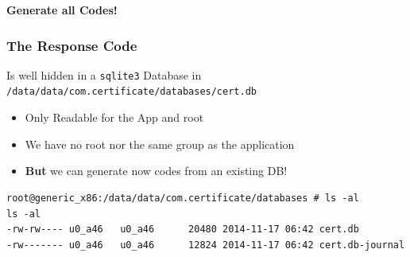 \documentclass[12pt,a4paper]{beamer}
\newcommand{\mybox}[1]{\par\noindent\colorbox{shadecolor}
{\color{textcolor}\parbox{\dimexpr\textwidth-2\fboxsep\relax}{\fontsize{3em}{3.5em}\selectfont\textbf{{#1}}}}}
\begin{document}
{
\begin{frame}[plain]

\mybox{Generate all Codes!}

\end{frame}
}

\begin{frame}[fragile]
	\frametitle{The Response Code}
	Is well hidden in a \texttt{sqlite3} Database in \texttt{/data/data/com.certificate/databases/cert.db}
	\begin{itemize}
		\item Only Readable for the App and root
		\item We have no root nor the same group as the application
		\item \textbf{But} we can generate now codes from an existing DB!
	\end{itemize}
	
	\begin{lstlisting}[basicstyle=\tiny]
root@generic_x86:/data/data/com.certificate/databases # ls -al
ls -al
-rw-rw---- u0_a46   u0_a46      20480 2014-11-17 06:42 cert.db
-rw------- u0_a46   u0_a46      12824 2014-11-17 06:42 cert.db-journal
\end{lstlisting}
\end{frame}
\end{document}
